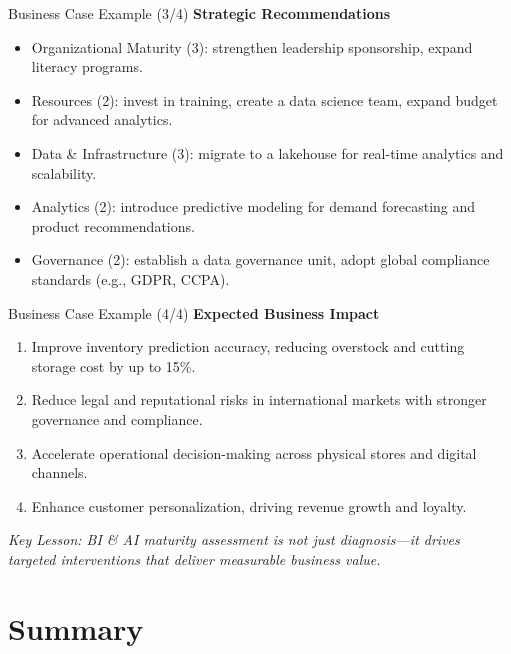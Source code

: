 \documentclass[aspectratio=169, table]{beamer}
\begin{document}
\begin{frame}{Business Case Example (3/4)}
	\vspace{20pt}
	\textbf{Strategic Recommendations}
	\begin{itemize}
		\item Organizational Maturity (3): strengthen leadership sponsorship, expand literacy programs.  
		\item Resources (2): invest in training, create a data science team, expand budget for advanced analytics.  
		\item Data \& Infrastructure (3): migrate to a lakehouse for real-time analytics and scalability.  
		\item Analytics (2): introduce predictive modeling for demand forecasting and product recommendations.  
		\item Governance (2): establish a data governance unit, adopt global compliance standards (e.g., GDPR, CCPA).  
	\end{itemize}
\end{frame}

\begin{frame}{Business Case Example (4/4)}
	\vspace{20pt}
	\textbf{Expected Business Impact}
	\begin{enumerate}
		\item Improve inventory prediction accuracy, reducing overstock and cutting storage cost by up to 15\%.  
		\item Reduce legal and reputational risks in international markets with stronger governance and compliance.  
		\item Accelerate operational decision-making across physical stores and digital channels.  
		\item Enhance customer personalization, driving revenue growth and loyalty.  
	\end{enumerate}
	
	\textit{Key Lesson: BI \& AI maturity assessment is not just diagnosis—it drives targeted interventions that deliver measurable business value.}
\end{frame}


\section{Summary}
\end{document}
